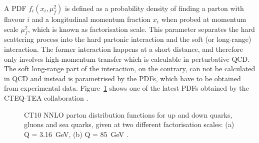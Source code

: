 A PDF $f_i(x_i,\mu_f^2)$ is defined as a probability density of finding a parton with flavour $i$ and a longitudinal
momentum fraction $x_i$ when probed at momentum scale $\mu_f^2$, which is known as factorisation scale. This parameter
separates the hard scattering process into the hard partonic interaction and the soft (or long-range) interaction. The
former interaction happens at a short distance, and therefore only involves high-momentum transfer which is calculable
in perturbative QCD. The soft long-range part of the interaction, on the contrary, can not be calculated in QCD and
instead is parametrised by the PDFs, which have to be obtained from experimental data. Figure~\ref{fig:CT10_PDFs} shows
one of the latest PDFs obtained by the CTEQ-TEA collaboration \autocite{CT10_NNLO}.

\begin{figure}[!hbtp]
   \centering
   \caption[CT10 NNLO parton distribution functions.]{CT10 NNLO parton distribution functions for up and down quarks,
   gluons and sea quarks, given at two different factorisation scales: (a) Q = \SI{3.16}{\GeV}, (b) Q =
   \SI{85}{\GeV} \autocite{CT10_NNLO}.}
   \label{fig:CT10_PDFs}
\end{figure}

